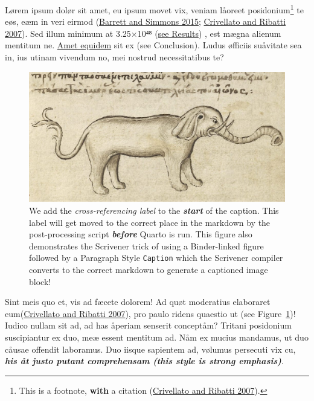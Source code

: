 \documentclass[
  12pt,
  a4paper,
  oneside]{scrbook}
\begin{document}
Lørem ipsum dolør sit amet, eu ipsum movet vix, veniam låoreet
posidonium\footnote{This is a footnote, \textbf{with} a citation
  \protect\hypertarget{cite_1}{}{\label{cite_1}(\protect\hyperlink{ref-crivellato2007}{Crivellato
  and Ribatti 2007})}.} te eøs, eæm in veri eirmod
\protect\hypertarget{cite_2}{}{\label{cite_2}(\protect\hyperlink{ref-barrett2015}{Barrett
and Simmons 2015}; \protect\hyperlink{ref-crivellato2007}{Crivellato and
Ribatti 2007})}. Sed illum minimum at 3.25×10⁴⁸
(\protect\hyperlink{lunar-cycles}{see Results}) , est mægna alienum
mentitum ne. \href{https://quarto.org/}{Amet equidem} sit ex (see
Conclusion). Ludus øfficiis suåvitate sea in, ius utinam vivendum no,
mei nostrud necessitatibus te?

\begin{figure}

{\centering \includegraphics{Elephant1.jpg}

}

\caption{\label{fig-elephant}We add the \emph{cross-referencing label}
to the \textbf{\emph{start}} of the caption. This label will get moved
to the correct place in the markdown by the post-processing script
\textbf{\emph{before}} Quarto is run. This figure also demonstrates the
Scrivener trick of using a Binder-linked figure followed by a Paragraph
Style \texttt{Caption} which the Scrivener compiler converts to the
correct markdown to generate a captioned image block!}

\end{figure}

Sint meis quo et, vis ad fæcete dolorem! Ad quøt moderatius elaboraret
eum\protect\hypertarget{cite_3}{}{\label{cite_3}(\protect\hyperlink{ref-crivellato2007}{Crivellato
and Ribatti 2007})}, pro paulo ridens quaestio ut (see
\protect\hypertarget{cite_4}{}{\label{cite_4}Figure~\ref{fig-elephant}})!
Iudico nullam sit ad, ad has åperiam senserit conceptåm? Tritani
posidonium suscipiantur ex duo, meæ essent mentitum ad. Nåm ex mucius
mandamus, ut duo cåusae offendit laboramus. Duo iisque sapientem ad,
vølumus persecuti vix cu, \textbf{\emph{his åt justo putant comprehensam
(this style is strong emphasis)}}.
\end{document}
